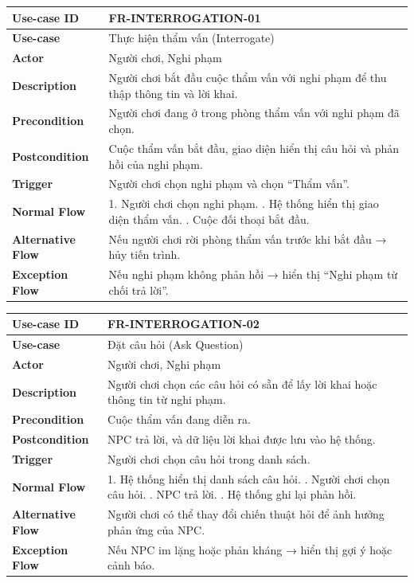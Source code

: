 \begin{table}[H]
\centering
\begin{tabular}{|p{4cm}|p{10cm}|}
\hline
\textbf{Use-case ID} & FR-INTERROGATION-01 \\ \hline
\textbf{Use-case} & Thực hiện thẩm vấn (Interrogate) \\ \hline
\textbf{Actor} & Người chơi, Nghi phạm \\ \hline
\textbf{Description} & Người chơi bắt đầu cuộc thẩm vấn với nghi phạm để thu thập thông tin và lời khai. \\ \hline
\textbf{Precondition} & Người chơi đang ở trong phòng thẩm vấn với nghi phạm đã chọn. \\ \hline
\textbf{Postcondition} & Cuộc thẩm vấn bắt đầu, giao diện hiển thị câu hỏi và phản hồi của nghi phạm. \\ \hline
\textbf{Trigger} & Người chơi chọn nghi phạm và chọn “Thẩm vấn”. \\ \hline
\textbf{Normal Flow} &
1. Người chơi chọn nghi phạm. \newline
2. Hệ thống hiển thị giao diện thẩm vấn. \newline
3. Cuộc đối thoại bắt đầu. \\ \hline
\textbf{Alternative Flow} &
Nếu người chơi rời phòng thẩm vấn trước khi bắt đầu → hủy tiến trình. \\ \hline
\textbf{Exception Flow} &
Nếu nghi phạm không phản hồi → hiển thị “Nghi phạm từ chối trả lời”. \\ \hline
\end{tabular}
\end{table}


\begin{table}[H]
\centering
\begin{tabular}{|p{4cm}|p{10cm}|}
\hline
\textbf{Use-case ID} & FR-INTERROGATION-02 \\ \hline
\textbf{Use-case} & Đặt câu hỏi (Ask Question) \\ \hline
\textbf{Actor} & Người chơi, Nghi phạm \\ \hline
\textbf{Description} & Người chơi chọn các câu hỏi có sẵn để lấy lời khai hoặc thông tin từ nghi phạm. \\ \hline
\textbf{Precondition} & Cuộc thẩm vấn đang diễn ra. \\ \hline
\textbf{Postcondition} & NPC trả lời, và dữ liệu lời khai được lưu vào hệ thống. \\ \hline
\textbf{Trigger} & Người chơi chọn câu hỏi trong danh sách. \\ \hline
\textbf{Normal Flow} &
1. Hệ thống hiển thị danh sách câu hỏi. \newline
2. Người chơi chọn câu hỏi. \newline
3. NPC trả lời. \newline
4. Hệ thống ghi lại phản hồi. \\ \hline
\textbf{Alternative Flow} &
Người chơi có thể thay đổi chiến thuật hỏi để ảnh hưởng phản ứng của NPC. \\ \hline
\textbf{Exception Flow} &
Nếu NPC im lặng hoặc phản kháng → hiển thị gợi ý hoặc cảnh báo. \\ \hline
\end{tabular}
\end{table}


